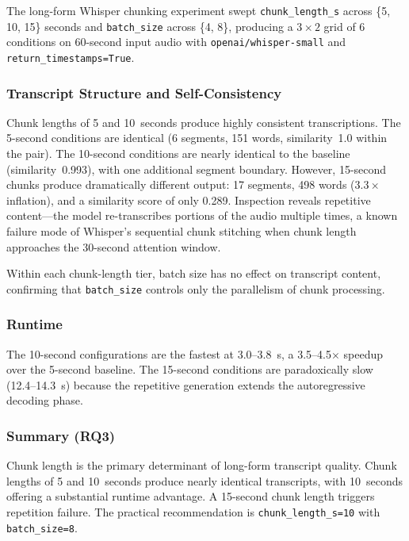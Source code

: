 \documentclass[conference]{IEEEtran}
\begin{document}
The long-form Whisper chunking experiment swept \texttt{chunk\_length\_s} across \{5, 10, 15\} seconds and \texttt{batch\_size} across \{4, 8\}, producing a $3 \times 2$ grid of 6 conditions on 60-second input audio with \texttt{openai/whisper-small} and \texttt{return\_timestamps=True}.

\subsubsection{Transcript Structure and Self-Consistency}

Chunk lengths of 5 and 10~seconds produce highly consistent transcriptions. The 5-second conditions are identical (6 segments, 151 words, similarity~1.0 within the pair). The 10-second conditions are nearly identical to the baseline (similarity~0.993), with one additional segment boundary. However, 15-second chunks produce dramatically different output: 17 segments, 498 words ($3.3\times$ inflation), and a similarity score of only 0.289. Inspection reveals repetitive content---the model re-transcribes portions of the audio multiple times, a known failure mode of Whisper's sequential chunk stitching when chunk length approaches the 30-second attention window.

Within each chunk-length tier, batch size has no effect on transcript content, confirming that \texttt{batch\_size} controls only the parallelism of chunk processing.

\subsubsection{Runtime}

The 10-second configurations are the fastest at 3.0--3.8~s, a 3.5--4.5$\times$ speedup over the 5-second baseline. The 15-second conditions are paradoxically slow (12.4--14.3~s) because the repetitive generation extends the autoregressive decoding phase.

\subsubsection{Summary (RQ3)}

Chunk length is the primary determinant of long-form transcript quality. Chunk lengths of 5 and 10~seconds produce nearly identical transcripts, with 10~seconds offering a substantial runtime advantage. A 15-second chunk length triggers repetition failure. The practical recommendation is \texttt{chunk\_length\_s=10} with \texttt{batch\_size=8}.
\end{document}
